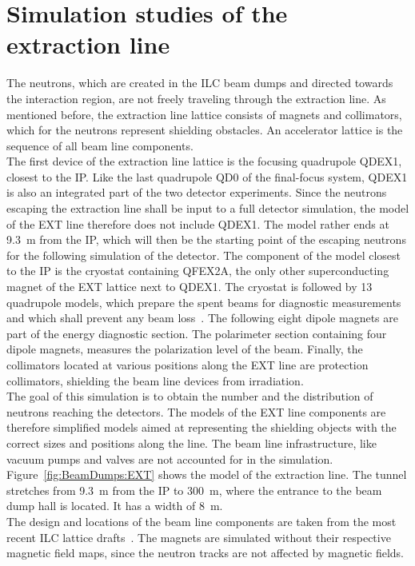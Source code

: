 \clearpage
\section{Simulation studies of the extraction line}
\label{BeamDumps:sim_EXT}

The neutrons, which are created in the ILC beam dumps and directed towards the interaction region, are not freely traveling through the extraction line.
As mentioned before, the extraction line lattice consists of magnets and collimators, which for the neutrons represent shielding obstacles.
An accelerator lattice is the sequence of all beam line components.
\\The first device of the extraction line lattice is the focusing quadrupole QDEX1, closest to the IP.
Like the last quadrupole QD0 of the final-focus system, QDEX1 is also an integrated part of the two detector experiments.
Since the neutrons escaping the extraction line shall be input to a full detector simulation, the \fluka model of the EXT line therefore does not include QDEX1.
The model rather ends at \SI{9.3}{\meter} from the IP, which will then be the starting point of the escaping neutrons for the following \geant simulation of the \sid detector.
The component of the \fluka model closest to the IP is the cryostat containing QFEX2A, the only other superconducting magnet of the EXT lattice next to QDEX1.
The cryostat is followed by 13 quadrupole models, which prepare the spent beams for diagnostic measurements and which shall prevent any beam loss~\cites[p. 139 ff]{TDR32}{EXT_design, EXT_design2}.
The following eight dipole magnets are part of the energy diagnostic section.
The polarimeter section containing four dipole magnets, measures the polarization level of the beam.
Finally, the collimators located at various positions along the EXT line are protection collimators, shielding the beam line devices from irradiation.
\\The goal of this \fluka simulation is to obtain the number and the distribution of neutrons reaching the detectors.
The models of the EXT line components are therefore simplified models aimed at representing the shielding objects with the correct sizes and positions along the line.
The beam line infrastructure, like vacuum pumps and valves are not accounted for in the simulation.
Figure~\ref{fig:BeamDumps:EXT} shows the \fluka model of the extraction line.
The tunnel stretches from \SI{9.3}{\meter} from the IP to \SI{300}{\meter}, where the entrance to the beam dump hall is located.
It has a width of \SI{8}{\meter}.
\\The design and locations of the beam line components are taken from the most recent ILC lattice drafts~\cite{EXT_lattice,EXT_lattice2}.
The magnets are simulated without their respective magnetic field maps, since the neutron tracks are not affected by magnetic fields.

